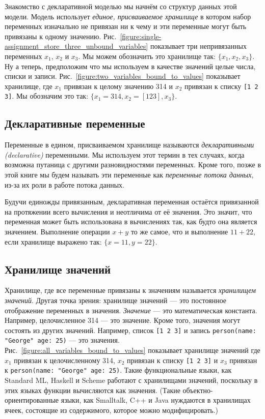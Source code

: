 Знакомство с декларативной моделью мы начнём со структур данных этой модели. Модель использует \emph{единое, присваиваемое хранилище} в котором набор переменных изначально не привязан ни к чему и эти переменные могут быть привязаны к одному значению. Рис.~\ref{figure:single-assignment_store_three_unbound_variables} показывает три непривязанных переменных $x_{1}$, $x_{2}$ и $x_{3}$. Мы можем обозначить это хранилище так: $\{x_{1}, x_{2}, x_{3}\}$. Ну а теперь, предположим что мы используем в качестве значений целые числа, списки и записи. Рис.~\ref{figure:two_variables_bound_to_values} показывает хранилище, где $x_{1}$ привязан к целому значению 314 и $x_{2}$ привязан к списку \lstinline|[1 2 3]|. Мы обозначим это так: $\{x_{1} = 314, x_{2} = [1 2 3], x_{3}\}$.

\subsection{Декларативные переменные}

Переменные в едином, присваиваемом хранилище называются \emph{декларативными (declarative)} переменными. Мы используем этот термин в тех случаях, когда возможна путаница с другими разновидностями переменных. Кроме того, позже в этой книге мы будем называть эти переменные как \emph{переменные потока данных}, из-за их роли в работе потока данных.

Будучи единожды привязанным, декларативная переменная остаётся привязанной на протяжении всего вычисления и неотличима от её значения. Это значит, что переменная может быть использована в вычислениях так, как будто она является значением. Выполнение операции $x+y$ то же самое, что и выполнение $11+22$, если хранилище выражено так: $\{x=11, y=22\}$.

\subsection{Хранилище значений}

Хранилище, где все переменные привязаны к значениям называется \emph{хранилищем значений}. Другая точка зрения: хранилище значений --- это постоянное отображение переменных в значения. \emph{Значение} --- это математическая константа. Например, целочисленное 314 --- это значение. Кроме того, значения могут состоять из других значений. Например, список \lstinline|[1 2 3]| и запись \lstinline|person(name: "George" age: 25)| --- это значения. Рис.~\ref{figure:all_variables_bound_to_values} показывает хранилище значений где $x_{1}$ привязан к целочисленному 314, $x_{2}$ привязан к списку \lstinline|[1 2 3]| и $x_{3}$ привязан к \lstinline|person(name: "George" age: 25)|. Такие функциональные языки, как Standard ML, Haskell и Scheme работают с хранилищами значений, поскольку в этих языках функции вычисляются как значения. (Такие объектно-ориентированные языки, как Smalltalk, C++ и Java нуждаются в хранилищах ячеек, состоящие из содержимого, которое можно модифицировать.)

